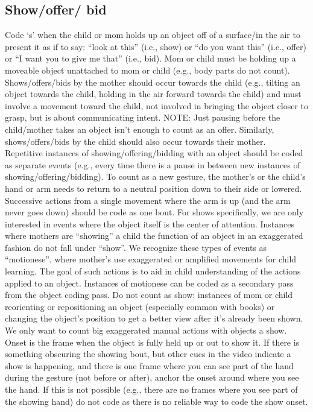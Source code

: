 \documentclass[
]{book}
\begin{document}
\hypertarget{show_offer_bid}{%
\subsection*{Show/offer/ bid}\label{show_offer_bid}}

Code `s' when the child or mom holds up an object off of a surface/in the air to present it as if to say: ``look at this'' (i.e., show) or ``do you want this'' (i.e., offer) or ``I want you to give me that'' (i.e., bid). Mom or child must be holding up a moveable object unattached to mom or child (e.g., body parts do not count). Shows/offers/bids by the mother should occur towards the child (e.g., tilting an object towards the child, holding in the air forward towards the child) and must involve a movement toward the child, not involved in bringing the object closer to grasp, but is about communicating intent. NOTE: Just pausing before the child/mother takes an object isn't enough to count as an offer. Similarly, shows/offers/bids by the child should also occur towards their mother.\\
Repetitive instances of showing/offering/bidding with an object should be coded as separate events (e.g., every time there is a pause in between new instances of showing/offering/bidding). To count as a new gesture, the mother's or the child's hand or arm needs to return to a neutral position down to their side or lowered. Successive actions from a single movement where the arm is up (and the arm never goes down) should be code as one bout.
For shows specifically, we are only interested in events where the object itself is the center of attention. Instances where mothers are ``showing'' a child the function of an object in an exaggerated fashion do not fall under ``show''. We recognize these types of events as ``motionese'', where mother's use exaggerated or amplified movements for child learning. The goal of such actions is to aid in child understanding of the actions applied to an object. Instances of motionese can be coded as a secondary pass from the object coding pass.
Do not count as show: instances of mom or child reorienting or repositioning an object (especially common with books) or changing the object's position to get a better view after it's already been shown. We only want to count big exaggerated manual actions with objects a show.
Onset is the frame when the object is fully held up or out to show it. If there is something obscuring the showing bout, but other cues in the video indicate a show is happening, and there is one frame where you can see part of the hand during the gesture (not before or after), anchor the onset around where you see the hand. If this is not possible (e.g., there are no frames where you see part of the showing hand) do not code as there is no reliable way to code the show onset.
\end{document}
